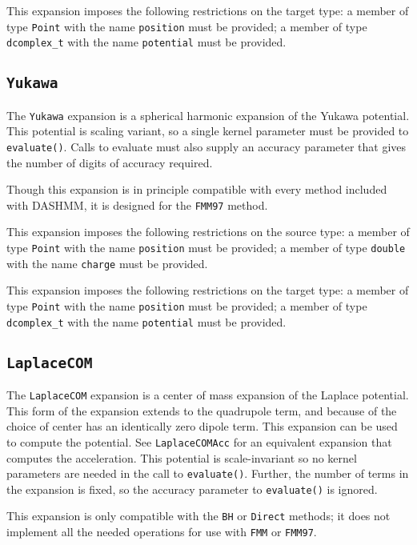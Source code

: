 This expansion imposes the following restrictions on the target type: a
member of type \texttt{Point} with the name \texttt{position} must be provided;
a member of type \texttt{dcomplex\_t} with the name \texttt{potential}
must be provided.

\subsection{\texttt{Yukawa}}

The \texttt{Yukawa} expansion is a spherical harmonic expansion of the Yukawa
potential. This potential is scaling variant, so a single kernel parameter
must be provided to \texttt{evaluate()}. Calls to evaluate must also supply an
accuracy parameter that gives the number of digits of accuracy required.

Though this expansion is in principle compatible with every method included
with DASHMM, it is designed for the \texttt{FMM97} method.

This expansion imposes the following restrictions on the source type: a
member of type \texttt{Point} with the name \texttt{position} must be provided;
a member of
type \texttt{double} with the name \texttt{charge} must be provided.

This expansion imposes the following restrictions on the target type: a
member of type \texttt{Point} with the name \texttt{position} must be provided;
a member of type \texttt{dcomplex\_t} with the name \texttt{potential}
 must be provided.

\subsection{\texttt{LaplaceCOM}}

The \texttt{LaplaceCOM} expansion is a center of mass expansion of the Laplace
potential. This form of the expansion extends to the quadrupole term, and
because of the choice of center has an identically zero dipole term. This
expansion can be used to compute the potential. See \texttt{LaplaceCOMAcc} for an
equivalent expansion that computes the acceleration. This potential is
scale-invariant so no kernel parameters are needed in the call to
\texttt{evaluate()}.
Further, the number of terms in the expansion is fixed, so the accuracy
parameter to \texttt{evaluate()} is ignored.

This expansion is only compatible with the \texttt{BH} or \texttt{Direct}
methods; it does not implement all the needed operations for use with
\texttt{FMM} or \texttt{FMM97}.

